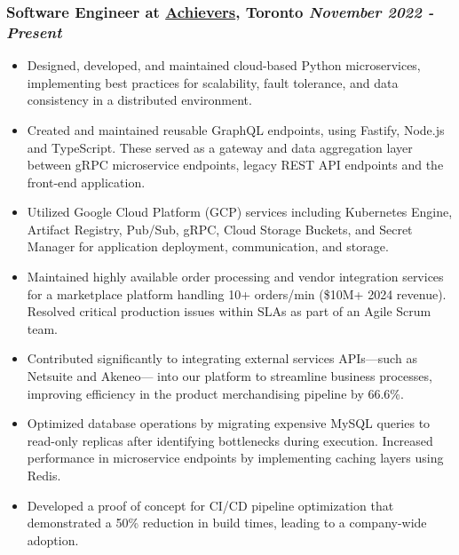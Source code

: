 \documentclass[a4paper,10pt]{article}
\begin{document}
\subsubsection*{%
  \textbf{Software Engineer} at \href{https://www.achievers.com/}{Achievers}, Toronto
  \hfill
  \textit{November 2022 - Present}
}
\begin{itemize}
  \item Designed, developed, and maintained cloud-based Python microservices, implementing best practices
    for scalability, fault tolerance, and data consistency in a distributed environment.
  \item Created and maintained reusable GraphQL endpoints, using Fastify, Node.js and TypeScript. These served as a gateway and data
    aggregation layer between gRPC microservice endpoints, legacy REST API endpoints and the front-end application.
  \item Utilized Google Cloud Platform (GCP) services including Kubernetes Engine, Artifact Registry,
    Pub/Sub, gRPC, Cloud Storage Buckets, and Secret Manager for application deployment, communication, and storage.
  \item Maintained highly available order processing and vendor integration services for a marketplace platform
    handling 10+ orders/min (\$10M+ 2024 revenue). Resolved critical production issues within SLAs as part of an Agile Scrum team.
  \item Contributed significantly to integrating external services APIs---such as Netsuite and Akeneo--- into our platform to streamline
    business processes, improving efficiency in the product merchandising pipeline by 66.6\%.
  \item Optimized database operations by migrating expensive MySQL queries to read-only replicas after identifying
    bottlenecks during execution. Increased performance in microservice endpoints by implementing caching layers
    using Redis.
  \item Developed a proof of concept for CI/CD pipeline optimization that demonstrated
    a 50\% reduction in build times, leading to a company-wide adoption.
\end{itemize}
\end{document}
